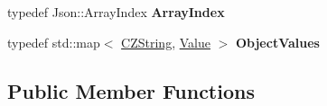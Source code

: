 \begin{DoxyCompactItemize}
\item 
\hypertarget{class_json_1_1_value_a184a91566cccca7b819240f0d5561c7d}{}typedef Json\+::\+Array\+Index {\bfseries Array\+Index}\label{class_json_1_1_value_a184a91566cccca7b819240f0d5561c7d}

\item 
\hypertarget{class_json_1_1_value_a08b6c80c3af7071d908dabf044de5388}{}typedef std\+::map$<$ \hyperlink{class_json_1_1_value_1_1_c_z_string}{C\+Z\+String}, \hyperlink{class_json_1_1_value}{Value} $>$ {\bfseries Object\+Values}\label{class_json_1_1_value_a08b6c80c3af7071d908dabf044de5388}

\end{DoxyCompactItemize}
\subsection*{Public Member Functions}
